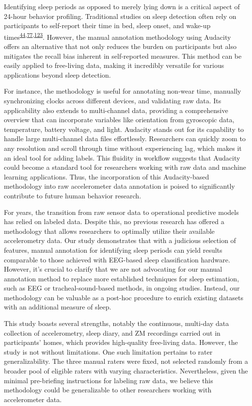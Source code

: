 \documentclass[
  10pt,
]{scrbook}
\begin{document}
Identifying sleep periods as opposed to merely lying down is a critical
aspect of 24-hour behavior profiling. Traditional studies on sleep
detection often rely on participants to self-report their time in bed,
sleep onset, and wake-up
times\textsuperscript{\protect\hyperlink{ref-girschik_validation_2012}{44},\protect\hyperlink{ref-littner_2003}{77},\protect\hyperlink{ref-lockley_1999}{123}}.
However, the manual annotation methodology using Audacity offers an
alternative that not only reduces the burden on participants but also
mitigates the recall bias inherent in self-reported measures. This
method can be easily applied to free-living data, making it incredibly
versatile for various applications beyond sleep detection.

For instance, the methodology is useful for annotating non-wear time,
manually synchronizing clocks across different devices, and validating
raw data. Its applicability also extends to multi-channel data,
providing a comprehensive overview that can incorporate variables like
orientation from gyroscopic data, temperature, battery voltage, and
light. Audacity stands out for its capability to handle large
multi-channel data files effortlessly. Researchers can quickly zoom to
any resolution and scroll through time without experiencing lag, which
makes it an ideal tool for adding labels. This fluidity in workflow
suggests that Audacity could become a standard tool for researchers
working with raw data and machine learning applications. Thus, the
incorporation of this Audacity-based methodology into raw accelerometer
data annotation is poised to significantly contribute to future human
behavior research.

For years, the transition from raw sensor data to operational predictive
models has relied on labeled data. Despite this, no previous research
has offered a methodology that allows researchers to optimally utilize
their available accelerometry data. Our study demonstrates that with a
judicious selection of features, manual annotation for identifying sleep
periods can yield results comparable to those achieved with EEG-based
sleep classification hardware. However, it's crucial to clarify that we
are not advocating for our manual annotation method to replace more
established techniques for sleep estimation, such as EEG or
tracheal-sound-based methods, in ongoing studies. Instead, our
methodology can be valuable as a post-hoc procedure to enrich existing
datasets with an additional measure of sleep.

This study boasts several strengths, notably the continuous, multi-day
data collection of accelerometry, sleep diary, and ZM recordings carried
out in participants' homes, which provides high-quality free-living
data. However, the study is not without limitations. One such limitation
pertains to rater generalizability. The three manual raters were fixed,
not selected randomly from a broader pool of eligible raters with
varying characteristics. Nevertheless, given the minimal pre-briefing
instructions for labeling raw data, we believe this methodology could be
generalizable to other researchers working with accelerometer data.
\end{document}
